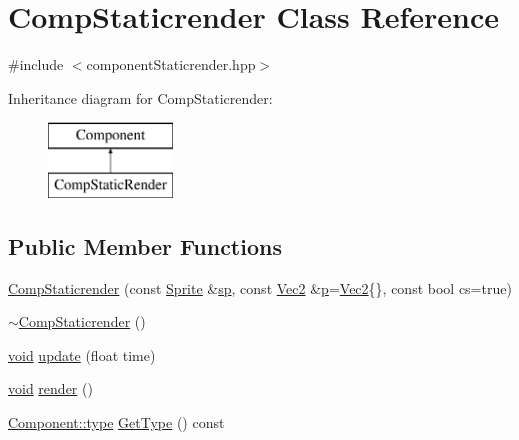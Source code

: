 \hypertarget{class_comp_static_render}{\section{Comp\-Static\-render Class Reference}
\label{class_comp_static_render}
}


{\ttfamily \#include $<$component\-Static\-render.\-hpp$>$}

Inheritance diagram for Comp\-Static\-render\-:\begin{figure}[H]
\begin{center}
\leavevmode
\includegraphics[height=2.000000cm]{class_comp_static_render}
\end{center}
\end{figure}
\subsection*{Public Member Functions}
\begin{DoxyCompactItemize}
\item 
\hyperlink{class_comp_static_render_afe3fe29902002bf6ab74398c76ec00b1}{Comp\-Static\-render} (const \hyperlink{class_sprite}{Sprite} \&\hyperlink{class_comp_static_render_a0b0396c860cd01d3572b68558e775ef6}{sp}, const \hyperlink{class_vec2}{Vec2} \&\hyperlink{_s_d_l__opengl__glext_8h_aa5367c14d90f462230c2611b81b41d23}{p}=\hyperlink{class_vec2}{Vec2}\{\}, const bool cs=true)
\item 
\hyperlink{class_comp_static_render_a6407e5bbb59d26b4c88c213f10b36fce}{$\sim$\-Comp\-Static\-render} ()
\item 
\hyperlink{_s_d_l__opengles2__gl2ext_8h_ae5d8fa23ad07c48bb609509eae494c95}{void} \hyperlink{class_comp_static_render_ae48cbdf0b5800c555d7454a3791de2f5}{update} (float time)
\item 
\hyperlink{_s_d_l__opengles2__gl2ext_8h_ae5d8fa23ad07c48bb609509eae494c95}{void} \hyperlink{class_comp_static_render_a1dee437e9c9c133b8dbbf73fe1a3010d}{render} ()
\item 
\hyperlink{class_component_ad6d161b6acf7b843b55bb9feac7af71a}{Component\-::type} \hyperlink{class_comp_static_render_af6da06eca12dbf351fd02de3d8228b37}{Get\-Type} () const 
\end{DoxyCompactItemize}
